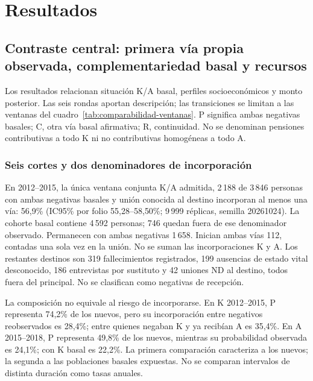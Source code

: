 \chapter{Resultados}
\label{cap:resultados}
\label{sec:proteccion-resultados}

\section{Contraste central: primera vía propia observada, complementariedad basal y recursos}
\label{sec:resultados-central09}
\label{sec:resultados-complementariedad}
Los resultados relacionan situación K/A basal, perfiles socioeconómicos y
monto posterior. Las seis rondas aportan descripción; las transiciones se
limitan a las ventanas del cuadro~\ref{tab:comparabilidad-ventanas}. P significa ambas negativas basales; C, otra vía basal afirmativa; R, continuidad. No se denominan pensiones contributivas a todo K ni no contributivas homogéneas a todo A.

\subsection{Seis cortes y dos denominadores de incorporación}




En 2012--2015, la única ventana conjunta K/A admitida, 2\,188 de 3\,846 personas con ambas negativas basales y unión conocida al destino incorporan al menos una vía: 56{,}9\% (IC95\% por folio 55{,}28--58{,}50\%; 9\,999 réplicas, semilla 20261024). La cohorte basal contiene 4\,592 personas; 746 quedan fuera de ese denominador observado. Permanecen con ambas negativas 1\,658. Inician ambas vías 112, contadas una sola vez en la unión. No se suman las incorporaciones K y A. Los restantes destinos son 319 fallecimientos registrados, 199 ausencias de
estado vital desconocido, 186 entrevistas por sustituto y 42 uniones ND
al destino, todos fuera del principal. No se clasifican como negativas de recepción.

La composición no equivale al riesgo de incorporarse. En K 2012--2015, P representa 74{,}2\% de los nuevos, pero su incorporación entre negativos reobservados es 28{,}4\%; entre quienes negaban K y ya recibían A es 35{,}4\%. En A 2015--2018, P representa 49{,}8\% de los nuevos, mientras su probabilidad observada es 24{,}1\%; con K basal es 22{,}2\%. La primera comparación caracteriza a los nuevos; la segunda a las poblaciones basales expuestas. No se comparan intervalos de distinta duración como tasas anuales.

